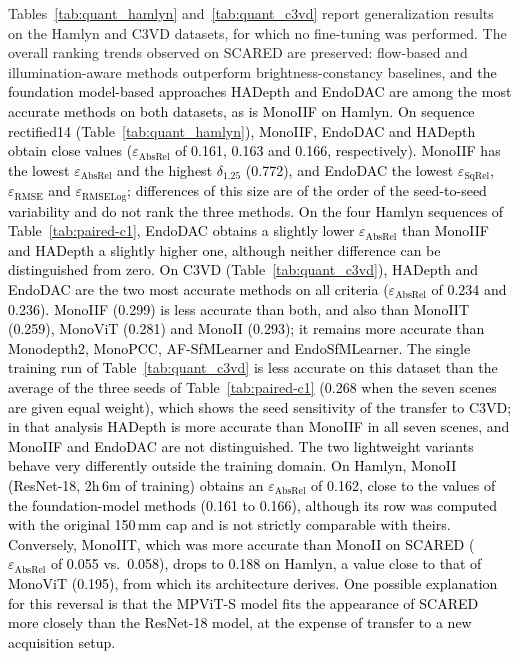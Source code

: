\documentclass[a4paper,fleqn]{cas-dc}
\begin{document}
{Tables~\ref{tab:quant_hamlyn} and~\ref{tab:quant_c3vd} report generalization results on the Hamlyn and C3VD datasets, for which no fine-tuning was performed. The overall ranking trends observed on SCARED are preserved: flow-based and illumination-aware methods outperform brightness-constancy baselines, \textcolor{black}{and the foundation model-based approaches HADepth and EndoDAC are among the most accurate methods on both datasets, as is MonoIIF on Hamlyn.} 
\textcolor{black}{On sequence rectified14 (Table~\ref{tab:quant_hamlyn}),} \textcolor{black}{MonoIIF, EndoDAC and HADepth obtain close values ($\varepsilon_\textrm{AbsRel}$ of 0.161, 0.163 and 0.166, respectively). MonoIIF has the lowest $\varepsilon_\textrm{AbsRel}$ and the highest $\delta_{1.25}$ (0.772), and EndoDAC the lowest $\varepsilon_\textrm{SqRel}$, $\varepsilon_\textrm{RMSE}$ and $\varepsilon_\textrm{RMSELog}$; differences of this size are of the order of the seed-to-seed variability and do not rank the three methods.} \textcolor{black}{ On the four Hamlyn sequences of Table~\ref{tab:paired-c1}, EndoDAC obtains a slightly lower $\varepsilon_\textrm{AbsRel}$ than MonoIIF and HADepth a slightly higher one, although neither difference can be distinguished from zero.
\textcolor{black}{On C3VD (Table~\ref{tab:quant_c3vd}), HADepth and EndoDAC are the two most accurate methods on all criteria ($\varepsilon_\textrm{AbsRel}$ of 0.234 and 0.236). MonoIIF (0.299) is less accurate than both, and also than MonoIIT (0.259), MonoViT (0.281) and MonoII (0.293); it remains more accurate than Monodepth2, MonoPCC, AF-SfMLearner and EndoSfMLearner. The single training run of Table~\ref{tab:quant_c3vd} is less accurate on this dataset than the average of the three seeds of Table~\ref{tab:paired-c1} (0.268 when the seven scenes are given equal weight), which shows the seed sensitivity of the transfer to C3VD; in that analysis HADepth is more accurate than MonoIIF in all seven scenes, and MonoIIF and EndoDAC are not distinguished.}}
\textcolor{black}
{
The two lightweight variants behave very differently outside the training domain. \textcolor{black}{On Hamlyn, MonoII (ResNet-18, 2h\,6m of training) obtains an $\varepsilon_\textrm{AbsRel}$ of 0.162, close to the values of the foundation-model methods (0.161 to 0.166), although its row was computed with the original 150\,mm cap and is not strictly comparable with theirs.} Conversely, MonoIIT, which was more accurate than MonoII on SCARED ($\varepsilon_\textrm{AbsRel}$ of 0.055 vs.\ 0.058), drops to 0.188 on Hamlyn, a value close to that of MonoViT (0.195), from which its architecture derives. One possible explanation for this reversal is that the MPViT-S model fits the appearance of SCARED more closely than the ResNet-18 model, at the expense of transfer to a new acquisition setup.
}}
\end{document}
